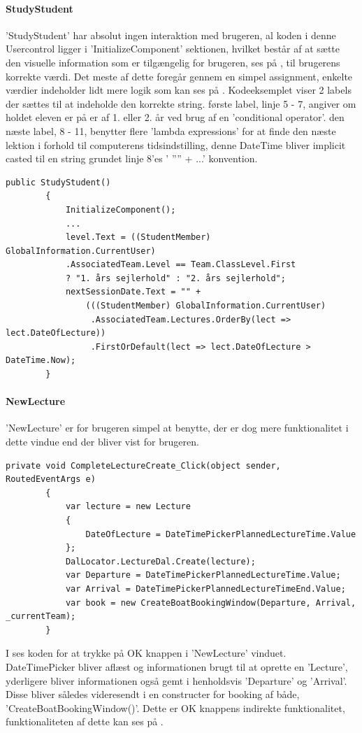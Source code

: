 \paragraph{StudyStudent}
'StudyStudent' har absolut ingen interaktion med brugeren, al koden i denne Usercontrol ligger i 'InitializeComponent' sektionen, hvilket består af at sætte den visuelle information som er tilgængelig for brugeren, ses på , til brugerens korrekte værdi. Det meste af dette foregår gennem en simpel assignment, enkelte værdier indeholder lidt mere logik som kan ses på \label{StudyStudentCode}. Kodeeksemplet viser 2 labels der sættes til at indeholde den korrekte string. første label, linje 5 - 7, angiver om holdet eleven er på er af 1. eller 2. år ved brug af en 'conditional operator'. den næste label, 8 - 11, benytter flere 'lambda expressions' for at finde den næste lektion i forhold til computerens tidsindstilling, denne DateTime bliver implicit casted til en string grundet linje 8'es ' '''' + ...' konvention.
\begin{lstlisting}[caption={Kode for at initialisere 'StudyStudent'.},
label=StudyStudentCode]
public StudyStudent()
        {
            InitializeComponent();
			...
            level.Text = ((StudentMember) GlobalInformation.CurrentUser)
            .AssociatedTeam.Level == Team.ClassLevel.First
            ? "1. års sejlerhold" : "2. års sejlerhold";
            nextSessionDate.Text = "" +
                (((StudentMember) GlobalInformation.CurrentUser)
                 .AssociatedTeam.Lectures.OrderBy(lect => lect.DateOfLecture))
                 .FirstOrDefault(lect => lect.DateOfLecture > DateTime.Now);
        }
\end{lstlisting}

\paragraph{NewLecture}
'NewLecture' er for brugeren simpel at benytte, der er dog mere funktionalitet i dette vindue end der bliver vist for brugeren.

\begin{lstlisting}[caption={Kode for 'OK' knap i 'NewLecture' 'Window'.}, label=NewLectureOk]
private void CompleteLectureCreate_Click(object sender, RoutedEventArgs e)
        {
            var lecture = new Lecture
            {
                DateOfLecture = DateTimePickerPlannedLectureTime.Value
            };
            DalLocator.LectureDal.Create(lecture);
            var Departure = DateTimePickerPlannedLectureTime.Value;
            var Arrival = DateTimePickerPlannedLectureTimeEnd.Value;
            var book = new CreateBoatBookingWindow(Departure, Arrival, _currentTeam);
        }
\end{lstlisting}
I  ses koden for at trykke på OK knappen i 'NewLecture' vinduet. DateTimePicker bliver aflæst og informationen brugt til at oprette en 'Lecture', yderligere bliver informationen også gemt i henholdsvis 'Departure' og 'Arrival'. Disse bliver således videresendt i en constructer for booking af både, 'CreateBoatBookingWindow()'. Dette er OK knappens indirekte funktionalitet, funktionaliteten af dette kan ses på .


